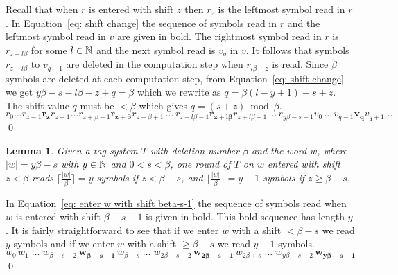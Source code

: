 \documentclass[11pt]{article} \usepackage{amsfonts,amsmath,amssymb,amsthm}
\renewenvironment{proof}{{\bfseries\noindent Proof.}}{\qed\vspace{3.5ex}}
\newtheorem{lemma}{Lemma}
\begin{document}
\begin{proof}
Recall that when $r$ is entered with shift $z$ then $r_z$ is the leftmost symbol read in $r$. In Equation~\eqref{eq: shift change} the sequence of symbols read in $r$ and the leftmost symbol read in $v$ are given in bold. The rightmost symbol read in $r$ is $r_{z+l\beta}$ for some $l\in\mathbb{N}$ and the next symbol read is $v_{q}$ in $v$. It follows that symbols $r_{z+l\beta}$ to $v_{q-1}$ are deleted in the computation step when $r_{l\beta+z}$ is read. Since $\beta$ symbols are deleted at each computation step, from Equation~\eqref{eq: shift change} we get $y\beta-s-l\beta-z+q=\beta$ which we rewrite as $q=\beta(l-y+1)+s+z$. The shift value $q$ must be $<\beta$ which gives $q=(s+z)\bmod\beta$.
\begin{equation}\label{eq: shift change}
r_0\dots r_{z-1}\pmb{r_z}r_{z+1}\ldots r_{z+\beta-1}\pmb{r_{z+\beta}}r_{z+\beta+1}\,\ldots\, r_{z+l\beta-1}\pmb{r_{z+l\beta}}r_{z+l\beta+1}\,\ldots\,r_{y\beta-s-1}v_{0}\,\ldots\, v_{q-1}\pmb{v_{q}} v_{q+1}\ldots
\end{equation}
\end{proof}

\begin{lemma}\label{lem:read upper or lower bound number of symbols}
Given a tag system $T$ with deletion number $\beta$ and the word $w$, where $|w|=y\beta-s$ with $y\in\mathbb{N}$ and $0<s<\beta$, one round of $T$ on $w$ entered with shift $z<\beta$ reads $\lceil\frac{|w|}{\beta}\rceil=y$ symbols if $z<\beta-s$, and $\lfloor\frac{|w|}{\beta}\rfloor=y-1$ symbols if $z\geqslant\beta-s$.
\end{lemma}
\begin{proof}
In Equation~\eqref{eq: enter w with shift beta-s-1} the sequence of symbols read when $w$ is entered with shift $\beta-s-1$ is given in bold. This bold sequence has length $y$.
It is fairly straightforward to see that if we enter $w$ with a shift $<\beta-s$ we read $y$ symbols and if we enter $w$ with a shift $\geqslant \beta-s$ we read $y-1$ symbols.
\begin{equation}\label{eq: enter w with shift beta-s-1}
w_0\,w_1\;\ldots\; w_{\beta-s-2}\,\pmb{w_{\beta-s-1}}\,w_{\beta-s}\;\ldots\; w_{2\beta-s-2}\,\pmb{w_{2\beta-s-1}}\,w_{2\beta+s}\;\ldots\; w_{y\beta-s-2}\,\pmb{w_{y\beta-s-1}}
\end{equation}
\end{proof}

 
\end{document}
